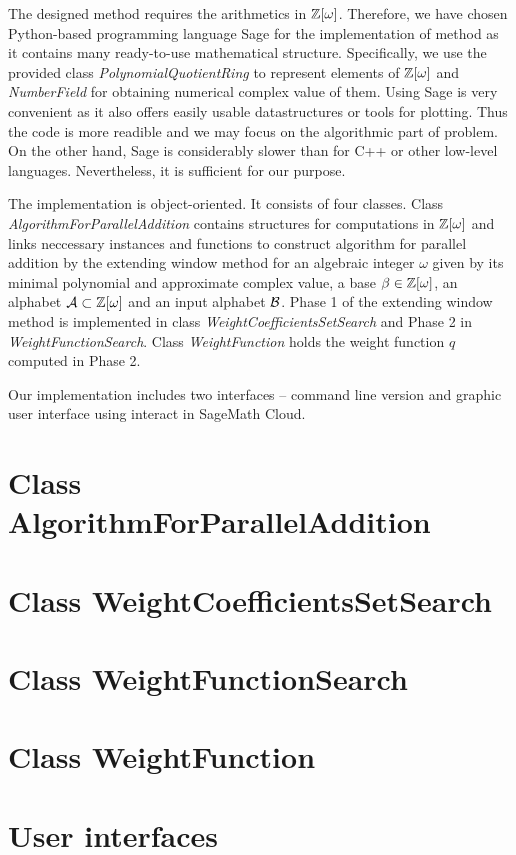 The designed method requires the arithmetics in $\mathbb{Z}[\omega]$. Therefore, we have chosen Python-based programming language Sage for the implementation of method as it contains many ready-to-use mathematical structure. Specifically, we use the provided class \emph{PolynomialQuotientRing} to represent elements of $\mathbb{Z}[\omega]$ and  \emph{NumberField} for obtaining numerical complex value of them. Using Sage is very convenient as it also offers easily usable datastructures or tools for plotting. Thus the code is more readible and we may focus on the algorithmic part of problem. On the other hand, Sage is considerably slower than for C++ or other low-level languages. Nevertheless, it is sufficient for our purpose.

The implementation is object-oriented. It consists of four classes. Class \emph{AlgorithmForParallelAddition} contains structures for computations in $\mathbb{Z}[\omega]$ and links neccessary instances and functions to construct algorithm for parallel addition by the extending window method for an algebraic integer $\omega$ given by its minimal polynomial and approximate complex value, a base $\beta\in\mathbb{Z}[\omega]$, an alphabet $\mathcal{A}\subset\mathbb{Z}[\omega]$ and an input alphabet $\mathcal{B}$. Phase 1 of the extending window method is implemented in class \emph{WeightCoefficientsSetSearch} and Phase 2 in \emph{WeightFunctionSearch}. Class \emph{WeightFunction} holds the weight function $q$ computed in Phase 2.

Our implementation includes two interfaces -- command line version and graphic user interface using interact in SageMath Cloud.   



\section{Class AlgorithmForParallelAddition}




\section{Class WeightCoefficientsSetSearch}



\section{Class WeightFunctionSearch}



\section{Class WeightFunction}


\section{User interfaces}